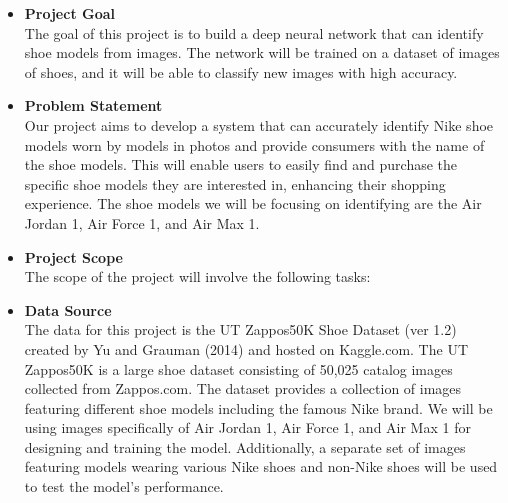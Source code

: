\documentclass{article}
\begin{document}
        \begin{itemize}
	   \item[] \textbf{Project Goal} \\
		The goal of this project is to build a deep neural network that can identify shoe models from images. The network will be trained on a dataset of images of shoes, and it will be able to classify new images with high accuracy. 
            \item[] \textbf{Problem Statement} \\
		Our project aims to develop a system that can accurately identify Nike shoe models worn by models in photos and provide consumers with the name of the shoe models. This will enable users to easily find and purchase the specific shoe models they are interested in, enhancing their shopping experience. 
		The shoe models we will be focusing on identifying are the Air Jordan 1, Air Force 1, and Air Max 1. 
	   \item[] \textbf{Project Scope} \\
		The scope of the project will involve the following tasks: 
            \item[] \textbf{Data Source} \\
		The data for this project is the UT Zappos50K Shoe Dataset (ver 1.2) created by Yu and Grauman (2014) and hosted on Kaggle.com. The UT Zappos50K is a large shoe dataset consisting of 50,025 catalog images collected from Zappos.com. The dataset provides a collection of images featuring different shoe models including the famous Nike brand. We will be using images specifically of Air Jordan 1, Air Force 1, and Air Max 1 for designing and training the model. Additionally, a separate set of images featuring models wearing various Nike shoes and non-Nike shoes will be used to test the model's performance. 

\end{itemize}
\end{document}
